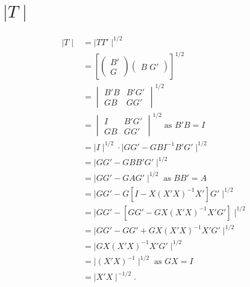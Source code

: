 \section{$\mid T \mid$}
\label{app:determinant_of_T}

\begin{align*}
	\mid T \mid &= \mid TT' \mid^{1/2} \\[0.2em]
	&= \left[\begin{pmatrix}
		B' \\
		G
	\end{pmatrix}
	\begin{pmatrix}
		B \; G'
	\end{pmatrix}\right]^{1/2} \\[0.2em]
	&= \begin{vmatrix}
		B'B & B'G' \\
		GB & GG'
	\end{vmatrix}^{1/2} \\[0.2em]
	&= \begin{vmatrix}
		I & B'G' \\
		GB & GG'
	\end{vmatrix}^{1/2} \; \text{as } B'B = I \\[0.2em]
	&= \mid I \mid^{1/2} \cdot \mid GG' - GBI^{-1}B'G' \mid^{1/2} \\[0.2em]
	&= \mid GG' - GBB'G' \mid^{1/2} \\[0.2em]
	&= \mid GG' - GAG' \mid^{1/2} \; \text{as } BB' = A \\[0.2em]
	&= \mid GG' - G\left[I - X(X'X)^{-1}X'\right]G' \mid^{1/2} \\[0.2em]
	&= \mid GG' - \left[GG' - GX(X'X)^{-1}X'G'\right] \mid^{1/2} \\[0.2em]
	&= \mid GG' - GG' + GX(X'X)^{-1}X'G' \mid^{1/2} \\[0.2em]
	&= \mid GX(X'X)^{-1}X'G' \mid^{1/2} \\[0.2em]
	&= \mid (X'X)^{-1} \mid^{1/2} \; \text{as } GX = I \\[0.2em]
	&= \mid X'X \mid^{-1/2}.
\end{align*}